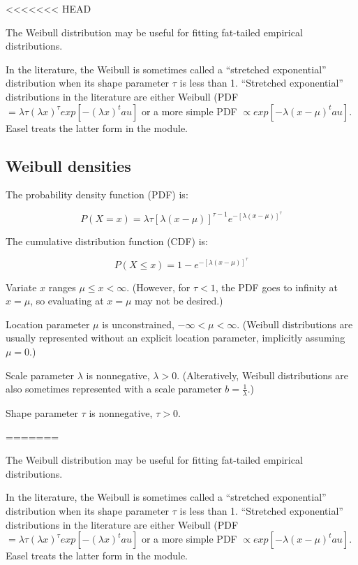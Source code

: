 <<<<<<< HEAD

The Weibull distribution may be useful for fitting fat-tailed
empirical distributions.

In the literature, the Weibull is sometimes called a ``stretched
exponential'' distribution when its shape parameter $\tau$ is less
than 1. ``Stretched exponential'' distributions in the literature are
either Weibull (PDF $ = \lambda \tau (\lambda x)^\tau exp\left[-
(\lambda x)^tau \right]$ or a more simple PDF $\propto exp\left[-
{\lambda(x-\mu)}^tau \right]$. Easel treats the latter form in the
 module.

\subsection{Weibull densities}

The probability density function (PDF) is:

\begin{equation}
P(X=x) = \lambda \tau [\lambda(x - \mu)]^{\tau-1} e^{- [\lambda(x-\mu)]^{\tau}}
\label{eqn:weibull_pdf}
\end{equation}

The cumulative distribution function (CDF) is:

\begin{equation}
P(X \leq x) = 1 - e^{- [\lambda(x-\mu)]^{\tau}}
\label{eqn:weibull_cdf}
\end{equation}

Variate $x$ ranges $\mu \leq x < \infty$. (However, for $\tau < 1$,
the PDF goes to infinity at $x=\mu$, so evaluating at $x=\mu$ may not
be desired.)

Location parameter $\mu$ is unconstrained, $-\infty < \mu <
\infty$. (Weibull distributions are usually represented without an
explicit location parameter, implicitly assuming $\mu = 0$.)

Scale parameter $\lambda$ is nonnegative, $\lambda >
0$. (Alteratively, Weibull distributions are also sometimes
represented with a scale parameter $b = \frac{1}{\lambda}$.)

Shape parameter $\tau$ is nonnegative, $\tau > 0$. 






=======

The Weibull distribution may be useful for fitting fat-tailed
empirical distributions.

In the literature, the Weibull is sometimes called a ``stretched
exponential'' distribution when its shape parameter $\tau$ is less
than 1. ``Stretched exponential'' distributions in the literature are
either Weibull (PDF $ = \lambda \tau (\lambda x)^\tau exp\left[-
(\lambda x)^tau \right]$ or a more simple PDF $\propto exp\left[-
{\lambda(x-\mu)}^tau \right]$. Easel treats the latter form in the
 module.

